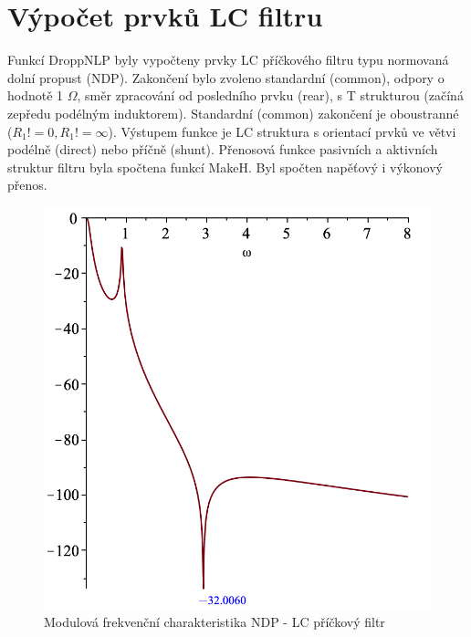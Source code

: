 \documentclass[twoside]{article}
\begin{document}
\section{Výpočet prvků LC filtru}
\noindent Funkcí DroppNLP byly vypočteny prvky LC příčkového filtru typu normovaná dolní propust (NDP). Zakončení bylo zvoleno standardní (common), odpory o hodnotě 1 $\Omega$, směr zpracování od posledního prvku (rear), s T strukturou (začíná zepředu podélným induktorem). Standardní (common) zakončení je oboustranné ($R_1 != 0, R_1 != \infty$). Výstupem funkce je LC struktura s orientací prvků ve větvi podélně (direct) nebo příčně (shunt).
\noindent Přenosová funkce pasivních a aktivních struktur filtru byla spočtena funkcí MakeH. Byl spočten  napěťový i výkonový přenos.
\begin{figure}[H]
\centering
\includegraphics[scale=0.6]{sch2.png}
\caption{Modulová frekvenční charakteristika NDP - LC příčkový filtr}
\end{figure}
\end{document}
